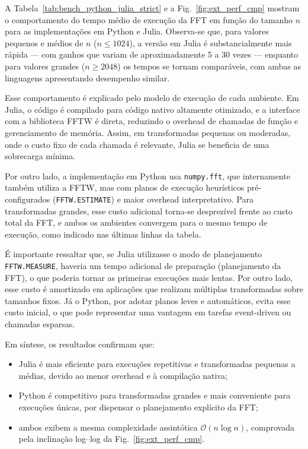 \documentclass[11pt,a4paper]{article}
\begin{document}
A Tabela~\ref{tab:bench_python_julia_strict} e a Fig.~\ref{fig:ext_perf_cmp}
mostram o comportamento do tempo médio de execução da FFT em função do tamanho $n$
para as implementações em Python e Julia. Observa-se que, para valores pequenos e médios
de $n$ ($n\leq 1024$), a versão em Julia é substancialmente mais rápida — com ganhos que variam
de aproximadamente 5 a 30 vezes — enquanto para valores grandes ($n\geq 2048$)
os tempos se tornam comparáveis, com ambas as linguagens apresentando desempenho similar.

Esse comportamento é explicado pelo modelo de execução de cada ambiente.
Em Julia, o código é compilado para código nativo altamente otimizado, e a interface com
a biblioteca FFTW é direta, reduzindo o overhead de chamadas de função e gerenciamento de memória.
Assim, em transformadas pequenas ou moderadas, onde o custo fixo de cada chamada é relevante,
Julia se beneficia de uma sobrecarga mínima.

Por outro lado, a implementação em Python usa \texttt{numpy.fft}, que internamente
também utiliza a FFTW, mas com planos de execução heurísticos pré-configurados
(\texttt{FFTW.ESTIMATE}) e maior overhead interpretativo.
Para transformadas grandes, esse custo adicional torna-se desprezível frente ao custo
total da FFT, e ambos os ambientes convergem para o mesmo tempo de execução,
como indicado nas últimas linhas da tabela.

É importante ressaltar que, se Julia utilizasse o modo de planejamento
\texttt{FFTW.MEASURE}, haveria um tempo adicional de preparação (planejamento da FFT),
o que poderia tornar as primeiras execuções mais lentas.
Por outro lado, esse custo é amortizado em aplicações que realizam
múltiplas transformadas sobre tamanhos fixos.
Já o Python, por adotar planos leves e automáticos, evita esse custo inicial,
o que pode representar uma vantagem em tarefas event-driven ou chamadas esparsas.

Em síntese, os resultados confirmam que:
\begin{itemize}
  \item Julia é mais eficiente para execuções repetitivas e transformadas pequenas a médias,
        devido ao menor overhead e à compilação nativa;
  \item Python é competitivo para transformadas grandes e mais conveniente para execuções únicas,
        por dispensar o planejamento explícito da FFT;
  \item ambos exibem a mesma complexidade assintótica $\mathcal{O}(n\log n)$,
        comprovada pela inclinação log--log da Fig.~\ref{fig:ext_perf_cmp}.
\end{itemize}
\end{document}
